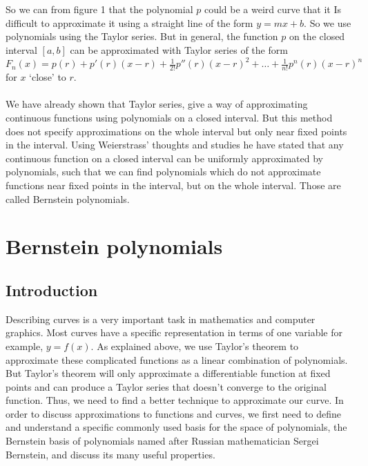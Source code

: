 \documentclass{article}
\begin{document}
So we can from figure 1 that the polynomial $p$ could be a weird curve that it Is difficult to approximate it using a straight line of the form $y=mx+b$.
So we use polynomials using the Taylor series.
But in general, the function $p$ on the closed interval $[a,b]$ can be approximated with Taylor series of the form $F_n(x) = p(r) + p'(r)(x - r) + \frac{1}{2!}p''(r) (x - r)^2 + \dots + \frac{1}{n!} p^n(r)(x - r)^n$ for $x$ `close' to $r$.
\paragraph{}
We have already shown that Taylor series, give a way of approximating continuous functions using polynomials on a closed interval. But this method does not specify approximations on the whole interval but only near fixed points in the interval. Using Weierstrass’ thoughts and studies he have stated that any continuous function on a closed interval can be uniformly approximated by polynomials, such that we can find polynomials which do not approximate functions near fixed points in the interval, but on the whole interval. Those are called Bernstein polynomials.
\section{Bernstein polynomials}
\subsection{Introduction}
Describing curves is a very important task in mathematics and computer graphics. Most curves have a specific  representation in terms of one variable for example, $y = f(x)$. As explained above, we use Taylor’s theorem to approximate these complicated functions as a linear combination of polynomials. But Taylor’s theorem will only approximate a differentiable function at fixed points and can produce a Taylor series that doesn’t converge to the original function. Thus, we need to find a better technique to approximate our curve.
In order to discuss approximations to functions and curves, we first need to define and understand a specific commonly used basis for the space of polynomials, the Bernstein basis of polynomials named after Russian mathematician Sergei Bernstein, and discuss its many useful properties.
\end{document}
